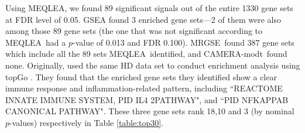 \documentclass[a4,center,fleqn]{NAR}
\newcommand{\OurMethod}{MEQLEA}
\newcommand{\CMT}{CAMERA-modt}
\newcommand{\genr}{MRGSE}
\begin{document}
	
	Using \OurMethod, we found 89 significant signals out of the entire 1330 gene sets at FDR level
	of 0.05. GSEA found 3 enriched gene sets---2 of them were also among those 89 gene sets (the one
	that was not significant according to \OurMethod~had a $p$-value of 0.013 and FDR 0.100).
	\genr~found 387 gene sets which include all the 89 sets \OurMethod~identified, and \CMT~found none.
	Originally, \cite{labadorf2015rna} used the same HD data set to conduct enrichment analysis using
	topGo \citep{alexa2010topgo}. They found that the enriched gene sets they identified show a clear
	immune response and inflammation-related pattern, including ``REACTOME INNATE IMMUNE SYSTEM, PID IL4
	2PATHWAY", and ``PID NFKAPPAB CANONICAL PATHWAY". These three gene sets rank 18,10 and 3 (by nominal
	$p$-values) respectively in Table \ref{table:top30}.
	
\end{document}
